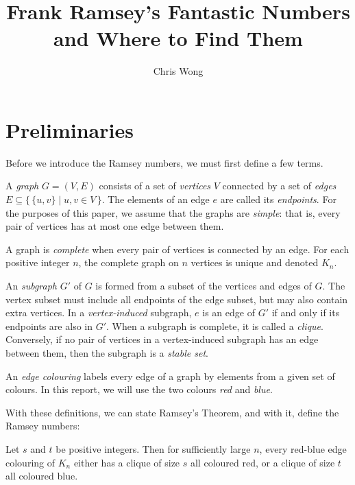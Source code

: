 \documentclass{article}
\begin{document}
\author{Chris Wong}
\title{Frank Ramsey's Fantastic Numbers and Where to Find Them}
\maketitle


\section{Preliminaries}

Before we introduce the Ramsey numbers, we must first define a few terms.

A \textit{graph} $G = (V, E)$ consists of a set of \textit{vertices} $V$ connected by a set of \textit{edges} $E \subseteq \{\, \{u, v\} \mid u, v \in V \,\}$. The elements of an edge $e$ are called its \textit{endpoints}. For the purposes of this paper, we assume that the graphs are \textit{simple}: that is, every pair of vertices has at most one edge between them.

A graph is \textit{complete} when every pair of vertices is connected by an edge. For each positive integer $n$, the complete graph on $n$ vertices is unique and denoted $K_n$.

An \textit{subgraph} $G'$ of $G$ is formed from a subset of the vertices and edges of $G$. The vertex subset must include all endpoints of the edge subset, but may also contain extra vertices. In a \textit{vertex-induced} subgraph, $e$ is an edge of $G'$ if and only if its endpoints are also in $G'$. When a subgraph is complete, it is called a \textit{clique}. Conversely, if no pair of vertices in a vertex-induced subgraph has an edge between them, then the subgraph is a \textit{stable set}.

An \textit{edge colouring} labels every edge of a graph by elements from a given set of colours. In this report, we will use the two colours \textit{red} and \textit{blue}.

With these definitions, we can state Ramsey's Theorem, and with it, define the Ramsey numbers:

\begin{Theorem} \label{ramseys_theorem}
    Let $s$ and $t$ be positive integers. Then for sufficiently large $n$, every red-blue edge colouring of $K_n$ either has a clique of size $s$ all coloured red, or a clique of size $t$ all coloured blue.
\end{Theorem}
\end{document}
